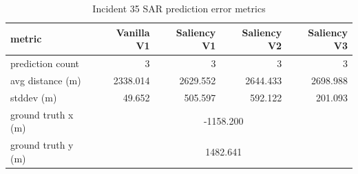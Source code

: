 \begin{table}[ht]
\centering
\caption{Incident 35 SAR prediction error metrics}
\label{tab:sar-incident-35}
\begin{tabular}{lrrrr}
\hline
metric & Vanilla V1 & Saliency V1 & Saliency V2 & Saliency V3 \\
\hline
prediction count & 3 & 3 & 3 & 3 \\
avg distance (m) & 2338.014 & 2629.552 & 2644.433 & 2698.988 \\
stddev (m) & 49.652 & 505.597 & 592.122 & 201.093 \\
ground truth x (m) & \multicolumn{4}{c}{-1158.200} \\
ground truth y (m) & \multicolumn{4}{c}{1482.641} \\
\hline
\end{tabular}
\end{table}

